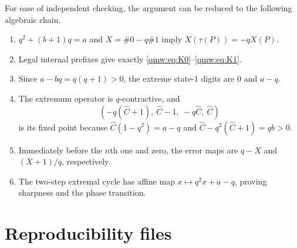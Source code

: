\documentclass[11pt]{article}
\numberwithin{equation}{section}
\theoremstyle{definition}
\theoremstyle{remark}
\begin{document}
For ease of independent checking, the argument can be reduced to the
following algebraic chain.

\begin{enumerate}[leftmargin=*,itemsep=3pt]
\item $q^2+(b+1)q=a$ and $X=\#0-q\#1$ imply
      $X(\tau(P))=-qX(P)$.
\item Legal internal prefixes give exactly
      \eqref{qmw:eq:K0}--\eqref{qmw:eq:K1}.
\item Since $a-bq=q(q+1)>0$, the extreme state-$1$ digits are $0$ and $a-q$.
\item The extremum operator is $q$-contractive, and
      \[
      (-q({\widehat C}+1),\ {\widehat C}-1,\ -q{\widehat C},\ {\widehat C})
      \]
      is its fixed point because ${\widehat C}(1-q^2)=a-q$ and
      ${\widehat C}-q^2({\widehat C}+1)=qb>0$.
\item Immediately before the $n$th one and zero, the error maps are
      $q-X$ and $(X+1)/q$, respectively.
\item The two-step extremal cycle has affine map
      $x\mapsto q^2x+a-q$, proving sharpness and the phase transition.
\end{enumerate}

\section{Reproducibility files}
\label{qmw:app:files}
\end{document}
